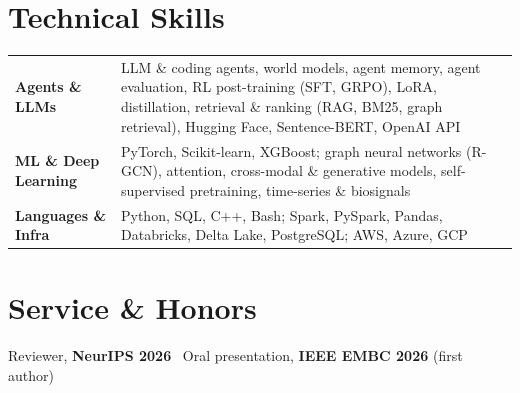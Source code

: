 \documentclass[letterpaper,10pt]{article}
\newcommand{\SKILLSIZE}{\fontsize{9}{10.8}\selectfont}
\begin{document}
\section{Technical Skills}
\vspace{1pt}
{\SKILLSIZE
\begin{tabularx}{\textwidth}{@{}p{1.25in}X@{}}
  \textbf{Agents \& LLMs} & LLM \& coding agents, world models, agent memory, agent evaluation, RL post-training (SFT, GRPO), LoRA, distillation, retrieval \& ranking (RAG, BM25, graph retrieval), Hugging Face, Sentence-BERT, OpenAI API \\
  \textbf{ML \& Deep Learning} & PyTorch, Scikit-learn, XGBoost; graph neural networks (R-GCN), attention, cross-modal \& generative models, self-supervised pretraining, time-series \& biosignals \\
  \textbf{Languages \& Infra} & Python, SQL, C++, Bash; Spark, PySpark, Pandas, Databricks, Delta Lake, PostgreSQL; AWS, Azure, GCP \\
\end{tabularx}
}

\section{Service \& Honors}
Reviewer, \textbf{NeurIPS 2026} \textperiodcentered\ Oral presentation, \textbf{IEEE EMBC 2026} (first author)
\end{document}
